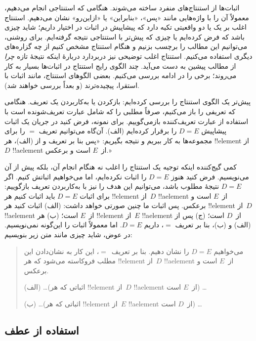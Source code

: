 \documentclass[../../../include/open-logic-section]{subfiles}
\begin{document}


اثبات‌ها از استنتاج‌های منفرد ساخته می‌شوند. هنگامی که استنتاجی
انجام می‌دهیم، معمولاً آن را با واژه‌هایی مانند «پس»، «بنابراین» یا
«ازاین‌رو» نشان می‌دهیم. استنتاج اغلب بر یک یا دو واقعیتی تکیه دارد
که پیشاپیش در اثبات در اختیار داریم؛ شاید چیزی باشد که فرض کرده‌ایم
یا چیزی که پیش‌تر با استنتاجی نتیجه گرفته‌ایم. برای روشنی، می‌توانیم
این مطالب را برچسب بزنیم و هنگام استنتاج مشخص کنیم از چه گزاره‌های
دیگری استفاده می‌کنیم. استنتاج اغلب توضیحی نیز دربردارد دربارهٔ
اینکه نتیجهٔ تازه \emph{چرا} از مطالب پیشین به دست می‌آید. چند
الگوی رایج استنتاج در اثبات‌ها بسیار به کار می‌روند؛ برخی را در
ادامه بررسی می‌کنیم. بعضی الگوهای استنتاج، مانند اثبات با استقرا،
پیچیده‌ترند (و بعداً بررسی خواهند شد).

پیش‌تر یک الگوی استنتاج را بررسی کرده‌ایم: بازکردن یا به‌کاربردن یک
تعریف. هنگامی که تعریفی را باز می‌کنیم، صرفاً مطلبی را که شامل
عبارت تعریف‌شونده است با استفاده از عبارت تعریف‌کننده بازمی‌گوییم. برای نمونه، فرض کنید
در جریان یک اثبات پیشاپیش $D = E$ را برقرار کرده‌ایم (الف). آن‌گاه
می‌توانیم تعریف $=$ را برای مجموعه‌ها به کار ببریم و نتیجه بگیریم:
«پس بنا بر تعریف و از (الف)، هر !!{element} از~$D$ !!a{element}
از~$E$ است و برعکس.»

کمی گیج‌کننده اینکه توجیه یک استنتاج را اغلب نه هنگام انجام آن،
بلکه پیش از آن می‌نویسیم. فرض کنید هنوز $D = E$ را اثبات نکرده‌ایم،
اما می‌خواهیم اثباتش کنیم. اگر $D = E$ نتیجهٔ مطلوب باشد، می‌توانیم
این هدف را نیز با به‌کاربردن تعریف بازگوییم: برای اثبات $D = E$
باید اثبات کنیم هر !!{element} از~$D$ !!a{element} از~$E$ است و
برعکس. پس اثبات ما چنین صورتی خواهد داشت: (الف) اثبات کنید هر
!!{element} از~$D$ !!a{element} از~$E$ است؛ (ب) هر !!{element}
از~$E$ !!a{element} از~$D$ است؛ (ج) پس از (الف) و (ب)، بنا بر
تعریف $=$، داریم $D = E$. اما معمولاً اثبات را این‌گونه نمی‌نویسیم.
در عوض، شاید چیزی مانند متن زیر بنویسیم:
\begin{quote}
می‌خواهیم $D = E$ را نشان دهیم. بنا بر تعریف~$=$، این کار به
نشان‌دادن این مطلب فروکاسته می‌شود که هر !!{element} از~$D$
!!a{element} از~$E$ است و برعکس.

(الف) \dots (اثباتی که هر !!{element} از~$D$ !!a{element}
از~$E$ است) \dots

(ب) \dots (اثباتی که هر !!{element} از~$E$ !!a{element}
از~$D$ است) \dots
\end{quote}

\subsection{استفاده از عطف}
\end{document}
